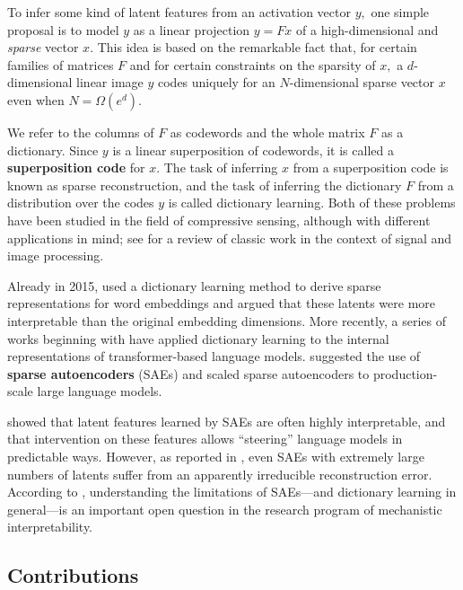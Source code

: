 To infer some kind of latent features from an activation vector $y,$ one simple proposal is to model $y$ as a linear projection $y = F x$ of a high-dimensional and \textit{sparse} vector $x.$ This idea is based on the remarkable fact that, for certain families of matrices $F$ and for certain constraints on the sparsity of $x,$ a $d$-dimensional linear image $y$ codes uniquely for an $N$-dimensional sparse vector $x$ even when $N = \Omega(e^d).$

We refer to the columns of $F$ as codewords and the whole matrix $F$ as a dictionary. Since $y$ is a linear superposition of codewords, it is called a \textbf{superposition code} for $x.$ The task of inferring $x$ from a superposition code is known as sparse reconstruction, and the task of inferring the dictionary $F$ from a distribution over the codes $y$ is called dictionary learning. Both of these problems have been studied in the field of compressive sensing, although with different applications in mind; see \citet{elad_sparse_2010} for a review of classic work in the context of signal and image processing.

Already in 2015, \citet{faruqui_sparse_2015} used a dictionary learning method to derive sparse representations for word embeddings and argued that these latents were more interpretable than the original embedding dimensions. More recently, a series of works beginning with \citet{yun_transformer_2021} have applied dictionary learning to the internal representations of transformer-based language models. \citet{cunningham_sparse_2023} suggested the use of \textbf{sparse autoencoders} (SAEs) and \citet{templeton_scaling_2024, gao_scaling_2024} scaled sparse autoencoders to production-scale large language models.

\citet{templeton_scaling_2024} showed that latent features learned by SAEs are often highly interpretable, and that intervention on these features allows ``steering'' language models in predictable ways. However, as reported in \citet{gao_scaling_2024}, even SAEs with extremely large numbers of latents suffer from an apparently irreducible reconstruction error. According to \citet{sharkey_open_2025}, understanding the limitations of SAEs---and dictionary learning in general---is an important open question in the research program of mechanistic interpretability.

\subsection{Contributions}

